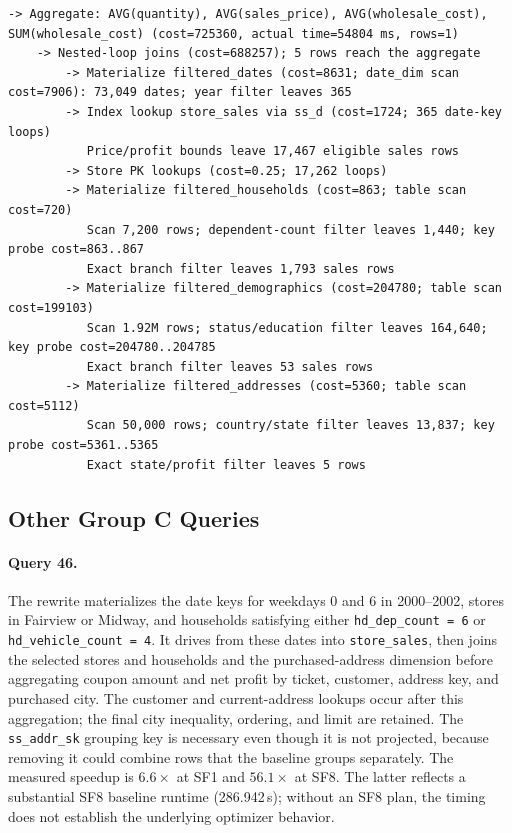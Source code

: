 \documentclass{ULBreport}
\begin{document}
\begin{lstlisting}[caption={Condensed optimized \texttt{EXPLAIN ANALYZE} plan on SF1 for Query 13}, label={lst:q13_explain_opt_sf1}, basicstyle=\ttfamily\scriptsize, breaklines=true, frame=single]
-> Aggregate: AVG(quantity), AVG(sales_price), AVG(wholesale_cost), SUM(wholesale_cost) (cost=725360, actual time=54804 ms, rows=1)
    -> Nested-loop joins (cost=688257); 5 rows reach the aggregate
        -> Materialize filtered_dates (cost=8631; date_dim scan cost=7906): 73,049 dates; year filter leaves 365
        -> Index lookup store_sales via ss_d (cost=1724; 365 date-key loops)
           Price/profit bounds leave 17,467 eligible sales rows
        -> Store PK lookups (cost=0.25; 17,262 loops)
        -> Materialize filtered_households (cost=863; table scan cost=720)
           Scan 7,200 rows; dependent-count filter leaves 1,440; key probe cost=863..867
           Exact branch filter leaves 1,793 sales rows
        -> Materialize filtered_demographics (cost=204780; table scan cost=199103)
           Scan 1.92M rows; status/education filter leaves 164,640; key probe cost=204780..204785
           Exact branch filter leaves 53 sales rows
        -> Materialize filtered_addresses (cost=5360; table scan cost=5112)
           Scan 50,000 rows; country/state filter leaves 13,837; key probe cost=5361..5365
           Exact state/profit filter leaves 5 rows
\end{lstlisting}

\subsection{Other Group C Queries}

\paragraph{Query 46.} The rewrite materializes the date keys for weekdays 0 and 6 in 2000--2002, stores in Fairview or Midway, and households satisfying either \texttt{hd\_dep\_count = 6} or \texttt{hd\_vehicle\_count = 4}. It drives from these dates into \texttt{store\_sales}, then joins the selected stores and households and the purchased-address dimension before aggregating coupon amount and net profit by ticket, customer, address key, and purchased city. The customer and current-address lookups occur after this aggregation; the final city inequality, ordering, and limit are retained. The \texttt{ss\_addr\_sk} grouping key is necessary even though it is not projected, because removing it could combine rows that the baseline groups separately. The measured speedup is $6.6\times$ at SF1 and $56.1\times$ at SF8. The latter reflects a substantial SF8 baseline runtime (286.942\,s); without an SF8 plan, the timing does not establish the underlying optimizer behavior.
\end{document}
